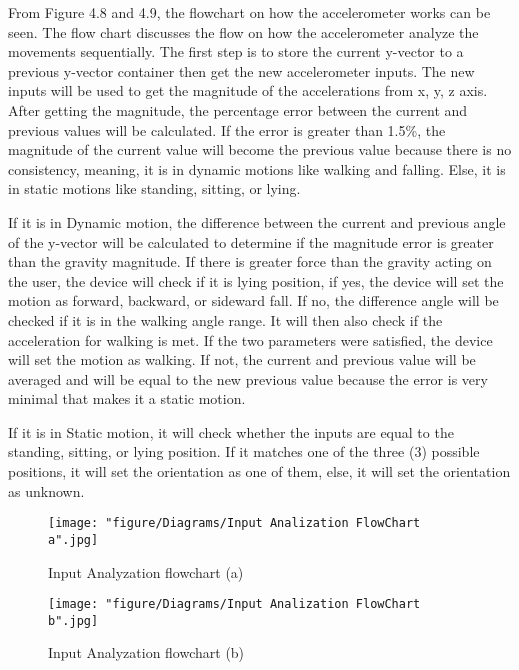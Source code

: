 From Figure 4.8 and 4.9, the flowchart on how the accelerometer works can be seen. The flow chart discusses the flow on how the accelerometer analyze the movements sequentially. The first step is to store the current y-vector to a previous y-vector container then get the new accelerometer inputs. The new inputs will be used to get the magnitude of the accelerations from x, y, z axis. After getting the magnitude, the percentage error between the current and previous values will be calculated. If the error is greater than 1.5\%, the magnitude of the current value will become the previous value because there is no consistency, meaning, it is in dynamic motions like walking and falling. Else, it is in static motions like standing, sitting, or lying.

If it is in Dynamic motion, the difference between the current and previous angle of the y-vector will be calculated to determine if the magnitude error is greater than the gravity magnitude. If there is greater force than the gravity acting on the user, the device will check if it is lying position, if yes, the device will set the motion as forward, backward, or sideward fall. If no, the difference angle will be checked if it is in the walking angle range. It will then also check if the acceleration for walking is met. If the two parameters were satisfied, the device will set the motion as walking. If not, the current and previous value will be averaged and will be equal to the new previous value because the error is very minimal that makes it a static motion.

If it is in Static motion, it will check whether the inputs are equal to the standing, sitting, or lying position. If it matches one of the three (3) possible positions, it will set the orientation as one of them, else, it will set the orientation as unknown.

\begin{figure}[htbp]
	\centering
		\texttt{[image: "figure/Diagrams/Input Analization FlowChart a".jpg]}
	\caption{Input Analyzation flowchart (a)}
	\label{fig:Input Analization FlowChart a}
\end{figure}

\begin{figure}[htbp]
	\centering
		\texttt{[image: "figure/Diagrams/Input Analization FlowChart b".jpg]}
	\caption{Input Analyzation flowchart (b)}
	\label{fig:Input Analization FlowChart b}
\end{figure}

